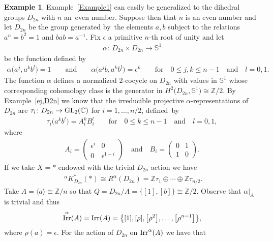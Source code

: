 \documentclass[pdftex]{sigma}
\def\Z{\mathbb{Z}}
\def\S{\mathbb{S}}
\def\C{\mathbb{C}}
\DeclareMathOperator{\Irr}{\textup{Irr}}
\theoremstyle{definition}
\newtheorem{Ex}[Th]{Example}
\numberwithin{equation}{section}
\begin{document}
\begin{Ex} Example~\ref{Example1} can easily be generalized to the dihedral groups $D_{2n}$
with $n$ an~even number. Suppose then that $n$ is an even number and let $D_{2n}$
be the group generated by~the elements $a,b$ subject to the relations $a^{n}=b^{2}=1$
and $bab=a^{-1}$. Fix $\epsilon$ a primitive $n$-th root of unity and let
\begin{gather*}
\alpha\colon\ D_{2n}\times D_{2n}\rightarrow \S^{1}
\end{gather*}
be the function defined by
\begin{gather*}
\alpha\big(a^{j},a^{k}b^{l}\big)=1 \qquad \text{and} \qquad \alpha\big(a^{j}b,a^{k}b^{l}\big)
=\epsilon^{k}\qquad \text{for}\quad 0\leq j,k\leq n-1 \quad \text{and}\quad l=0,1.
\end{gather*}
The function $\alpha$ defines a normalized $2$-cocycle on $D_{2n}$ with values in $\S^{1}$ whose
corresponding cohomology class is the generator in $H^{2}\big(D_{2n},\S^{1}\big)\cong \Z/2$.
By Example~\ref{ej,D2n} we know that the irreducible projective $\alpha$-representations of
$D_{2n}$ are $\tau_{i}\colon D_{2n}\rightarrow {\rm GL}_{2}(\C)$ for $i=1,\dots, n/2$, defined~by
\begin{gather*}
\tau_{i}\big(a^{k}b^{l}\big)=A_{i}^{k}B_{i}^{l} \qquad\text{for} \quad 0\leq k\leq n-1 \quad \text{and}\quad l=0,1,
\end{gather*}
where
\begin{gather*}
A_{i}=
\begin{pmatrix}
\epsilon^{i} & 0\\
0 & \epsilon^{1-i}
\end{pmatrix}
\quad \text{and}\quad
B_{i}=
\begin{pmatrix}
0 & 1\\
1 & 0
\end{pmatrix}\!.
\end{gather*}
If we take $X=\ast$ endowed with the trivial $D_{2n}$ action we have
\begin{gather*}
\phantom{i}^{\alpha}K^{\ast}_{D_{2n}}(\ast)\cong R^{\alpha}(D_{2n})
=\Z\tau_{1}\oplus\cdots \oplus \Z\tau_{n/2}.
\end{gather*}
Take $A=\langle a\rangle \cong\Z/n$ so that $Q=D_{2n}/A=\{[1],[b]\}\cong \Z/2$.
Observe that $\alpha|_{A}$ is trivial and thus
\begin{gather*}
\Irr^{\alpha}(A)=\Irr(A)=\big\{[1],[\rho],\big[\rho^{2}\big],\dots, \big[\rho^{n-1}\big]\big\},
\end{gather*}
where $\rho(a)=\epsilon$. For the action of $D_{2n}$ on $\Irr^{\alpha}(A)$ we have that

\end{Ex}
\end{document}
